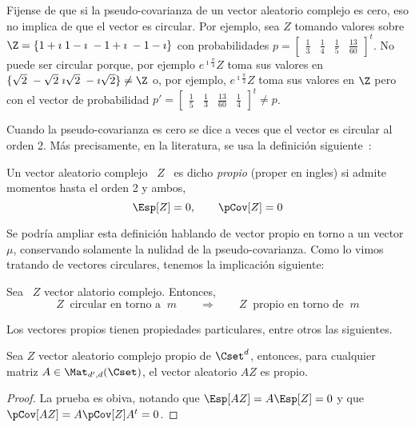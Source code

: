 Fijense de que si la pseudo-covarianza  de un vector aleatorio complejo es cero,
eso  no implica de  que el  vector es  circular.  Por  ejemplo, sea  $Z$ tomando
valores sobre  $\Z = \{ 1+\imath \;  1-\imath \; -1+\imath \;  -1-\imath \}$ con
probabilidades   $p  =   \begin{bmatrix}   \frac13  &   \frac14   &  \frac15   &
  \frac{13}{60}  \end{bmatrix}^t$. No  puede  ser circular  porque, por  ejemplo
$e^{\imath \frac{\pi}{4}} Z$ toma sus valores en $\{ \sqrt2 \; -\sqrt2 \; \imath
\sqrt2 \; -\imath \sqrt2 \} \ne \Z$ o, por ejemplo, $e^{\imath \frac{\pi}{2}} Z$
toma   sus  valores   en  $\Z$   pero  con   el  vector   de   probabilidad  $p'
= \begin{bmatrix} \frac15 & \frac13 & \frac{13}{60} & \frac14\end{bmatrix}^t \ne
p$.

Cuando la pseudo-covarianza es cero se dice a veces que el vector es circular al
orden  2.  M\'as  precisamente,  en   la  literatura,  se  usa  la  definici\'on
siguiente~\cite[Def.~17.4.1]{Lap17}:
%
\begin{definicion}\label{Def:MP:VectorAleatorioComplejoPropio}
%
  Un vector aleatorio complejo \ $Z$  \ es dicho {\em propio} (proper en ingles)
  si admite momentos hasta el orden 2 y ambos,
  \[
  \Esp[Z] = 0, \qquad \pCov[Z] = 0
  \]
\end{definicion}
%
Se podr\'ia ampliar  esta definici\'on hablando de vector propio  en torno a un
vector $\mu$, conservando solamente la  nulidad de la pseudo-covarianza. Como lo
vimos tratando de vectores circulares, tenemos la implicaci\'on siguiente:

\begin{teorema}[Circularidad]
\label{Teo:MP:Circularidad}
%
  Sea   \   $Z$ vector alatorio complejo.  Entonces,
%
  \[
  Z \:  \mbox{ circular en torno  a } \:  m \qquad \Longrightarrow \qquad  Z \:
  \mbox{ propio en torno de } \: m
  \]
\end{teorema}

Los vectores propios tienen  propiedades particulares, entre otros las siguientes.

\begin{teorema}\label{Teo:MP:PropioLineal}
%
  Sea  $Z$  vector  aleatorio  complejo  propio  de  $\Cset^d$,  entonces,  para
  cualquier matriz $A \in \Mat_{d',d}(\Cset)$, el vector aleatorio $A Z$ es propio.
\end{teorema}
\begin{proof}
  La prueba es obiva, notando que $\Esp[A Z]  = A \Esp[Z] = 0$ y que $\pCov[A Z]
  = A \pCov[Z] A^t = 0$.
\end{proof}



